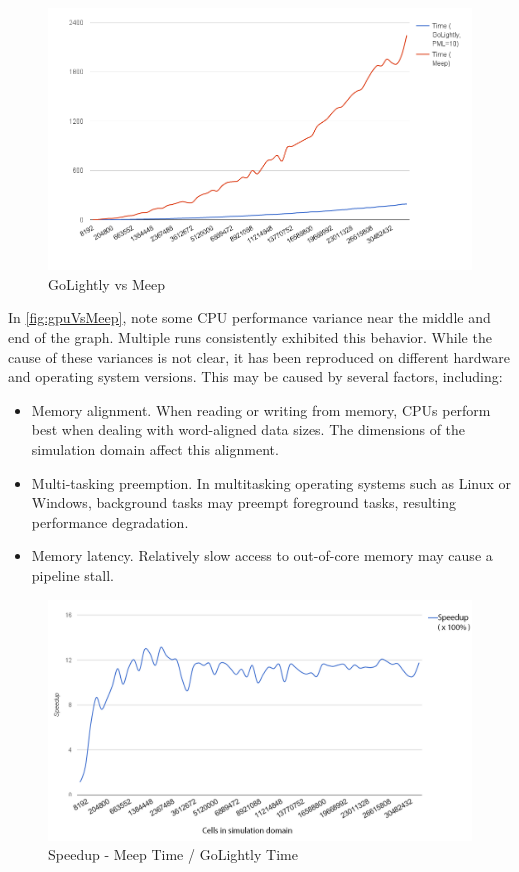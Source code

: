 \begin{figure}[H]
	\centering
	\includegraphics[width=\textwidth,
	keepaspectratio]{gpu-vs-meep.png}
	\caption{GoLightly vs Meep}
	\label{fig:gpuVsMeep}
\end{figure}

In \autoref{fig:gpuVsMeep}, note some CPU performance variance near the middle and end of the graph. Multiple runs consistently exhibited this behavior. While the cause of these variances is not clear, it has been reproduced on different hardware and operating system versions. 
This may be caused by several factors, including:

\begin{itemize}
	\item Memory alignment. When reading or writing from memory, CPUs perform best when dealing with word-aligned data sizes. The dimensions of the simulation domain affect this alignment.
	\item Multi-tasking preemption. In multitasking operating systems such as Linux or Windows, background tasks may preempt foreground tasks, resulting performance degradation. 
	\item Memory latency. Relatively slow access to out-of-core memory may cause a pipeline stall.	
\end{itemize}


\begin{figure}[H]
	\centering
	\includegraphics[width=\textwidth,
	keepaspectratio]{gpu-vs-meep-speedup.png}
	\caption{Speedup - Meep Time / GoLightly Time}
	\label{fig:gpuVsMeepSpeedup}
\end{figure}

